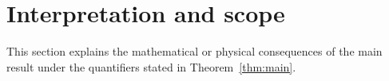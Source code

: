 \section{Interpretation and scope}

This section explains the mathematical or physical consequences of the main
result under the quantifiers stated in Theorem~\ref{thm:main}.
